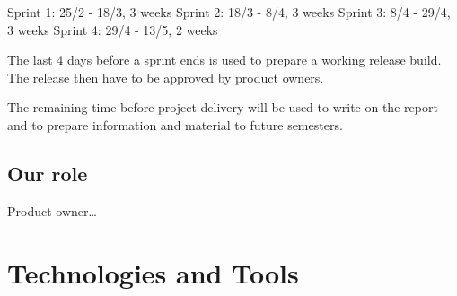 Sprint 1: 25/2 - 18/3, 3 weeks
Sprint 2: 18/3 - 8/4, 3 weeks
Sprint 3: 8/4 - 29/4, 3 weeks
Sprint 4: 29/4 - 13/5, 2 weeks

The last 4 days before a sprint ends is used to prepare a working release build. 
The release then have to be approved by product owners.

The remaining time before project delivery will be used to write on the report and to prepare information and material to future semesters. 


\subsection{Our role}
Product owner…


\section{Technologies and Tools}


